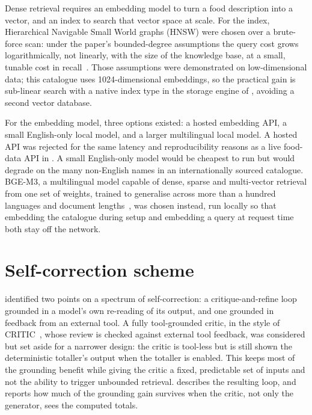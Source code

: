 Dense retrieval requires an embedding model to turn a food description into a vector, and an index to search that vector space at scale. For the index, Hierarchical Navigable Small World graphs (HNSW) were chosen over a brute-force scan: under the paper's bounded-degree assumptions the query cost grows logarithmically, not linearly, with the size of the knowledge base, at a small, tunable cost in recall~\cite{malkov2018efficient}. Those assumptions were demonstrated on low-dimensional data; this catalogue uses 1024-dimensional embeddings, so the practical gain is sub-linear search with a native index type in the storage engine of , avoiding a second vector database.

For the embedding model, three options existed: a hosted embedding API, a small English-only local model, and a larger multilingual local model. A hosted API was rejected for the same latency and reproducibility reasons as a live food-data API in . A small English-only model would be cheapest to run but would degrade on the many non-English names in an internationally sourced catalogue. BGE-M3, a multilingual model capable of dense, sparse and multi-vector retrieval from one set of weights, trained to generalise across more than a hundred languages and document lengths~\cite{chen2024bgem3}, was chosen instead, run locally so that embedding the catalogue during setup and embedding a query at request time both stay off the network.

\section{Self-correction scheme}
\label{sec:tools-self-correction}

 identified two points on a spectrum of self-correction: a critique-and-refine loop grounded in a model's own re-reading of its output, and one grounded in feedback from an external tool. A fully tool-grounded critic, in the style of \textsc{CRITIC}~\cite{gou2024critic}, whose review is checked against external tool feedback, was considered but set aside for a narrower design: the critic is tool-less but is still shown the deterministic totaller's output when the totaller is enabled. This keeps most of the grounding benefit while giving the critic a fixed, predictable set of inputs and not the ability to trigger unbounded retrieval.  describes the resulting loop, and  reports how much of the grounding gain survives when the critic, not only the generator, sees the computed totals.


